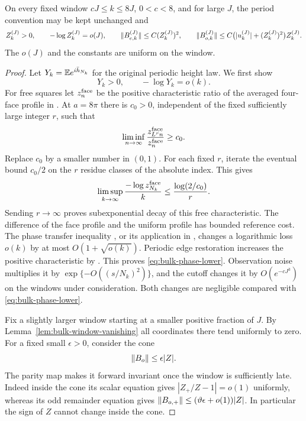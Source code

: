 \begin{lemma}
\label{lem:bulk-odd}
On every fixed window $cJ\le k\le8J$, $0<c<8$, and for large
$J$, the period convention may be kept unchanged and
\begin{equation}\label{eq:bulk-odd-estimates}
 Z_k^{(J)}>0,\qquad -\log Z_k^{(J)}=o(J),\qquad
 \lVert B_{e,k}^{(J)}\rVert\le C(Z_k^{(J)})^2,
 \qquad
 \lVert B_{o,k}^{(J)}\rVert\le
 C\bigl(|u_k^{(J)}|+(Z_k^{(J)})^2\bigr)Z_k^{(J)}.
\end{equation}
The $o(J)$ and the constants are uniform on the window.
\end{lemma}

\begin{proof}
Let $Y_k=\mathbb E e^{i\bar h_{N_k}}$ for the original periodic height
law.  We first show
\begin{equation}\label{eq:bulk-phase-lower}
 Y_k>0,\qquad -\log Y_k=o(k).
\end{equation}
For free squares let $z_n^{\rm face}$ be the positive
characteristic ratio of the averaged four-face profile in
\cite[Equation (2.15)]{X}.  At $a=8\pi$ there is
$c_0>0$, independent of the fixed sufficiently large integer $r$,
such that
\[
 \liminf_{n\to\infty}
 \frac{z_{L^rn}^{\rm face}}{z_n^{\rm face}}\ge c_0.
\]
Replace $c_0$ by a smaller number in $(0,1)$.  For each fixed $r$,
iterate the eventual bound $c_0/2$ on the $r$ residue classes of
the absolute index.  This gives
\[
 \limsup_{k\to\infty}\frac{-\log z_{N_k}^{\rm face}}k
 \le\frac{\log(2/c_0)}r.
\]
Sending $r\to\infty$ proves subexponential decay of this free
characteristic.  The difference of the face profile and the
uniform profile has bounded reference cost.  The phase transfer
inequality \cite[Equation (2.2)]{X}, or its
application in \cite[Lemma 10.7]{B},
changes a logarithmic loss $o(k)$ by at most $O(1+\sqrt{o(k)})$.
Periodic edge restoration increases the positive characteristic
by \cite[Lemma 2.2]{X}.  This proves
\eqref{eq:bulk-phase-lower}.  Observation noise multiplies it
by $\exp\{-O((s/N_k)^2)\}$, and the cutoff changes it by
$O(e^{-cJ^3})$ on the windows under consideration.  Both changes
are negligible compared with \eqref{eq:bulk-phase-lower}.

Fix a slightly larger window starting at a smaller positive
fraction of $J$.  By Lemma~\ref{lem:bulk-window-vanishing} all
coordinates there tend uniformly to zero.  For a fixed small
$\epsilon>0$, consider the cone
\[
 \lVert B_o\rVert\le\epsilon|Z|.
\]
The parity map makes it forward invariant once the window is
sufficiently late.  Indeed inside the cone its scalar equation
gives $|Z_+/Z-1|=o(1)$ uniformly, whereas its odd remainder
equation gives
$\lVert B_{o,+}\rVert\le(\vartheta\epsilon+o(1))|Z|$.
In particular the sign of $Z$ cannot change inside the cone.


\end{proof}
